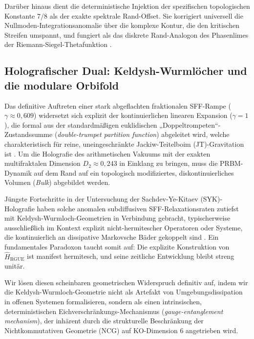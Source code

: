 \documentclass[aps,prl,preprint,superscriptaddress,floatfix]{revtex4-2}
\begin{document}
Darüber hinaus dient die deterministische Injektion der spezifischen topologischen Konstante $7/8$ als der exakte spektrale Rand-Offset. Sie korrigiert universell die Nullmoden-Integrationsanomalie über die komplexe Kontur, die den kritischen Streifen umspannt, und fungiert als das diskrete Rand-Analogon des Phasenlimes der Riemann-Siegel-Thetafunktion \cite{Corless1996, Borwein2008}.

\subsection{Holografischer Dual: Keldysh-Wurmlöcher und die modulare Orbifold}

Das definitive Auftreten einer stark abgeflachten fraktionalen SFF-Rampe ($\gamma \approx 0,609$) widersetzt sich explizit der kontinuierlichen linearen Expansion ($\gamma = 1$), die formal aus der standardmäßigen euklidischen „Doppeltrompeten“-Zustandssumme (\textit{double-trumpet partition function}) abgeleitet wird, welche charakteristisch für reine, uneingeschränkte Jackiw-Teitelboim (JT)-Gravitation ist \cite{Saad2019, Cotler2017}. Um die Holografie des arithmetischen Vakuums mit der exakten multifraktalen Dimension $D_2 \approx 0,243$ in Einklang zu bringen, muss die PRBM-Dynamik auf dem Rand auf ein topologisch modifiziertes, diskontinuierliches Volumen (\textit{Bulk}) abgebildet werden.

Jüngste Fortschritte in der Untersuchung der Sachdev-Ye-Kitaev (SYK)-Holografie haben solche anomalen subdiffusiven SFF-Relaxationsraten zutiefst mit Keldysh-Wurmloch-Geometrien in Verbindung gebracht, typischerweise ausschließlich im Kontext explizit nicht-hermitescher Operatoren oder Systeme, die kontinuierlich an dissipative Markovsche Bäder gekoppelt sind \cite{Zheng2023b, GarciaGarcia2023, Arias2024}. Ein fundamentales Paradoxon taucht somit auf: Die explizite Konstruktion von $\hat{H}_{\text{RGUE}}$ ist manifest hermitesch, und seine zeitliche Entwicklung bleibt streng unitär.

Wir lösen diesen scheinbaren geometrischen Widerspruch definitiv auf, indem wir die Keldysh-Wurmloch-Geometrie nicht als Artefakt von Umgebungsdissipation in offenen Systemen formalisieren, sondern als einen intrinsischen, deterministischen Eichverschränkungs-Mechanismus (\textit{gauge-entanglement mechanism}), der inhärent durch die strukturelle Beschränkung der Nichtkommutativen Geometrie (NCG) auf KO-Dimension 6 angetrieben wird.
\end{document}
